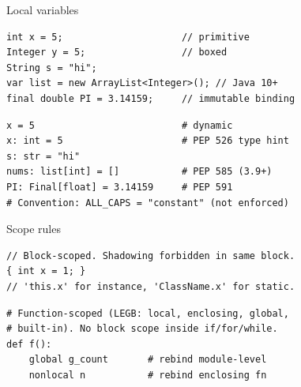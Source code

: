 \documentclass[10pt]{article}
\begin{document}

\begin{construct}{Local variables}
\noindent
\begin{minipage}[t]{0.485\linewidth}
\begin{lstlisting}[style=java, title=Java]
int x = 5;                     // primitive
Integer y = 5;                 // boxed
String s = "hi";
var list = new ArrayList<Integer>(); // Java 10+
final double PI = 3.14159;     // immutable binding
\end{lstlisting}
\end{minipage}\hfill
\begin{minipage}[t]{0.485\linewidth}
\begin{lstlisting}[style=python, title=Python]
x = 5                          # dynamic
x: int = 5                     # PEP 526 type hint
s: str = "hi"
nums: list[int] = []           # PEP 585 (3.9+)
PI: Final[float] = 3.14159     # PEP 591
# Convention: ALL_CAPS = "constant" (not enforced)
\end{lstlisting}
\end{minipage}
\end{construct}

\begin{construct}{Scope rules}
\noindent
\begin{minipage}[t]{0.485\linewidth}
\begin{lstlisting}[style=java, title=Java]
// Block-scoped. Shadowing forbidden in same block.
{ int x = 1; }
// 'this.x' for instance, 'ClassName.x' for static.
\end{lstlisting}
\end{minipage}\hfill
\begin{minipage}[t]{0.485\linewidth}
\begin{lstlisting}[style=python, title=Python]
# Function-scoped (LEGB: local, enclosing, global,
# built-in). No block scope inside if/for/while.
def f():
    global g_count       # rebind module-level
    nonlocal n           # rebind enclosing fn
\end{lstlisting}
\end{minipage}
\end{construct}

\end{document}

